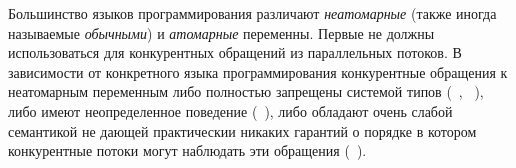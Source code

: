 
Большинство языков программирования различают 
\emph{неатомарные} (также иногда называемые \emph{обычными})
и \emph{атомарные} переменны.
Первые не должны использоваться для конкурентных 
обращений из параллельных потоков. 
В зависимости от конкретного языка программирования
конкурентные обращения к неатомарным переменным 
либо полностью запрещены системой типов
(\eg \Haskell~\cite{Marlow-al:Haskell10, Vollmer-al:PPoPP17}, \Rust~\cite{RustBook:19}), 
либо имеют неопределенное поведение (\eg \CPP~\cite{Boehm-Adve:PLDI08, Batty-al:POPL11}), 
либо обладают очень слабой семантикой
не дающей практическии никаких гарантий о порядке
в котором конкурентные потоки могут наблюдать эти обращения
(\eg \Java~\cite{Manson-al:POPL05}). 

